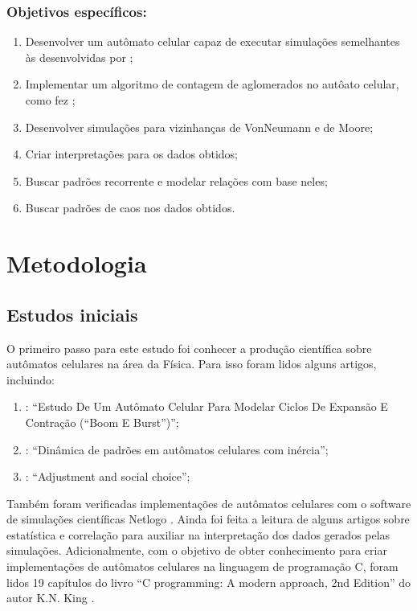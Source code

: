 \documentclass[
	12pt,				%
	openright,			%
	twoside,			%
	a4paper,			%
	english,			%
	french,				%
	spanish,			%
	brazil				%
	]{abntex2}
\begin{document}
\subsection*{Objetivos específicos:}
\begin{enumerate}
  \item Desenvolver um autômato celular capaz de executar simulações semelhantes às desenvolvidas por ;
  \item Implementar um algoritmo de contagem de aglomerados no autôato celular, como fez ;
  \item Desenvolver simulações para vizinhanças de VonNeumann e de Moore;
  \item Criar interpretações para os dados obtidos;
  \item Buscar padrões recorrente e modelar relações com base neles;
  \item Buscar padrões de caos nos dados obtidos.
\end{enumerate}


\chapter{Metodologia}

\section{Estudos iniciais}

O primeiro passo para este estudo foi conhecer a produção científica sobre autômatos celulares na área da Física. Para isso foram lidos alguns artigos, incluindo:
\begin{enumerate}
    \item {}: “Estudo De Um Autômato Celular Para Modelar Ciclos De Expansão E Contração (“Boom E Burst”)”;
    \item {}: “Dinâmica de padrões em autômatos celulares com inércia”;
    \item {}: “Adjustment and social choice”;
\end{enumerate}
Também foram verificadas implementações de autômatos celulares  com o software de simulações científicas Netlogo \cite{netlogo}. Ainda foi feita a leitura de alguns artigos sobre estatística \cite{statistics} e correlação para auxiliar na interpretação dos dados gerados pelas simulações. Adicionalmente, com o objetivo de obter conhecimento para criar implementações de autômatos celulares na linguagem de programação C, foram  lidos 19 capítulos do livro “C programming: A modern approach, 2nd Edition” do autor K.N. King \cite{king}.
    
\end{document}
